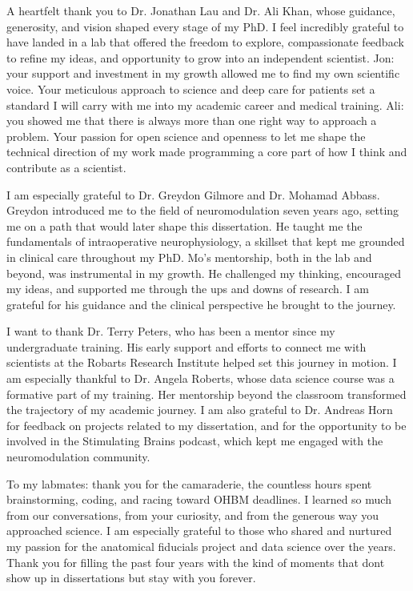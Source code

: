 \onehalfspacing
A heartfelt thank you to Dr. Jonathan Lau and Dr. Ali Khan, whose guidance, generosity, and vision shaped every stage of my PhD. I feel incredibly grateful to have landed in a lab that offered the freedom to explore, compassionate feedback to refine my ideas, and opportunity to grow into an independent scientist. Jon: your support and investment in my growth allowed me to find my own scientific voice. Your meticulous approach to science and deep care for patients set a standard I will carry with me into my academic career and medical training. Ali: you showed me that there is always more than one right way to approach a problem. Your passion for open science and openness to let me shape the technical direction of my work made programming a core part of how I think and contribute as a scientist.

I am especially grateful to Dr. Greydon Gilmore and Dr. Mohamad Abbass. Greydon introduced me to the field of neuromodulation seven years ago, setting me on a path that would later shape this dissertation. He taught me the fundamentals of intraoperative neurophysiology, a skillset that kept me grounded in clinical care throughout my PhD. Mo’s mentorship, both in the lab and beyond, was instrumental in my growth. He challenged my thinking, encouraged my ideas, and supported me through the ups and downs of research. I am grateful for his guidance and the clinical perspective he brought to the journey.

I want to thank Dr. Terry Peters, who has been a mentor since my undergraduate training. His early support and efforts to connect me with scientists at the Robarts Research Institute helped set this journey in motion. I am especially thankful to Dr. Angela Roberts, whose data science course was a formative part of my training. Her mentorship beyond the classroom transformed the trajectory of my academic journey. I am also grateful to Dr. Andreas Horn for feedback on projects related to my dissertation, and for the opportunity to be involved in the Stimulating Brains podcast, which kept me engaged with the neuromodulation community.

To my labmates: thank you for the camaraderie, the countless hours spent brainstorming, coding, and racing toward OHBM deadlines. I learned so much from our conversations, from your curiosity, and from the generous way you approached science. I am especially grateful to those who shared and nurtured my passion for the anatomical fiducials project and data science over the years. Thank you for filling the past four years with the kind of moments that dont show up in dissertations but stay with you forever.

